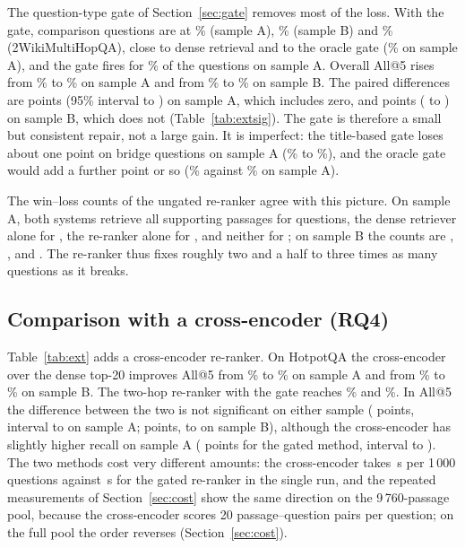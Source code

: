 \documentclass[a4paper,fleqn]{cas-sc}
\begin{document}
The question-type gate of Section~\ref{sec:gate} removes most of the loss. With the gate, comparison questions are at \TypHAGatecomparison\% (sample A), \TypHBGatecomparison\% (sample B) and \TypTWGatecomparison\% (2WikiMultiHopQA), close to dense retrieval and to the oracle gate (\TypHAOraccomparison\% on sample A), and the gate fires for \ExtHAGateGated\% of the questions on sample A. Overall All@5 rises from \ExtHATwoAll\% to \ExtHAGateAll\% on sample A and from \ExtHBTwoAll\% to \ExtHBGateAll\% on sample B. The paired differences are \ExtHAGateVTwoAllD{} points (95\% interval \ExtHAGateVTwoAllLo{} to \ExtHAGateVTwoAllHi{}) on sample A, which includes zero, and \ExtHBGateVTwoAllD{} points (\ExtHBGateVTwoAllLo{} to \ExtHBGateVTwoAllHi{}) on sample B, which does not (Table~\ref{tab:extsig}). The gate is therefore a small but consistent repair, not a large gain. It is imperfect: the title-based gate loses about one point on bridge questions on sample A (\TypHATwobridge\% to \TypHAGatebridge\%), and the oracle gate would add a further point or so (\ExtHAOracAll\% against \ExtHAGateAll\% on sample A).

The win--loss counts of the ungated re-ranker agree with this picture. On sample A, both systems retrieve all supporting passages for \WABoth{} questions, the dense retriever alone for \WADenseOnly{}, the re-ranker alone for \WAHtwoOnly{}, and neither for \WANeither{}; on sample B the counts are \WBBoth{}, \WBDenseOnly{}, \WBHtwoOnly{} and \WBNeither{}. The re-ranker thus fixes roughly two and a half to three times as many questions as it breaks.

\subsection{Comparison with a cross-encoder (RQ4)}

Table~\ref{tab:ext} adds a cross-encoder re-ranker. On HotpotQA the cross-encoder over the dense top-20 improves All@5 from \ExtHADenseAll\% to \ExtHACEAll\% on sample A and from \ExtHBDenseAll\% to \ExtHBCEAll\% on sample B. The two-hop re-ranker with the gate reaches \ExtHAGateAll\% and \ExtHBGateAll\%. In All@5 the difference between the two is not significant on either sample (\ExtHAGateVCEAllD{} points, interval \ExtHAGateVCEAllLo{} to \ExtHAGateVCEAllHi{} on sample A; \ExtHBGateVCEAllD{} points, \ExtHBGateVCEAllLo{} to \ExtHBGateVCEAllHi{} on sample B), although the cross-encoder has slightly higher recall on sample A (\ExtHAGateVCERecD{} points for the gated method, interval \ExtHAGateVCERecLo{} to \ExtHAGateVCERecHi{}). The two methods cost very different amounts: the cross-encoder takes \ExtHACESec\,s per 1\,000 questions against \ExtHAGateSec\,s for the gated re-ranker in the single run, and the repeated measurements of Section~\ref{sec:cost} show the same direction on the 9\,760-passage pool, because the cross-encoder scores 20 passage--question pairs per question; on the full pool the order reverses (Section~\ref{sec:cost}).
\end{document}
